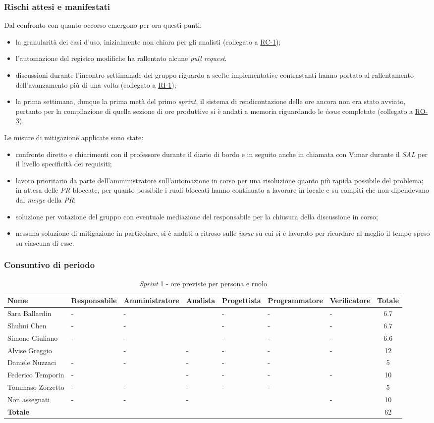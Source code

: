 \documentclass[11pt, a4paper]{article}
\newcommand{\rigaore}[8]{#1 & #2 & #3 & #4 & #5 & #6 & #7 & #8 \\ \hline}
\newcommand{\tabellaore}[3]{%
	\begin{table}[H]
		\centering
		\renewcommand{\arraystretch}{1.3}\small
		\setlength{\tabcolsep}{3pt}
		\setlength{\arrayrulewidth}{0.8pt}
		{\arrayrulecolor{gray!50}
			\begin{tabular}{|l|>{\centering\arraybackslash}p{1.65cm}|>{\centering\arraybackslash}p{1.65cm}|>{\centering\arraybackslash}p{1.65cm}|>{\centering\arraybackslash}p{1.65cm}|>{\centering\arraybackslash}p{1.65cm}|>{\centering\arraybackslash}p{1.65cm}|c|}
				\hline
				\rowcolor{gray!10}
				\textbf{Nome} &
				\hspace{0pt}\textbf{Responsabile} &
				\hspace{0pt}\textbf{Amministratore} &
				\hspace{0pt}\textbf{Analista} &
				\hspace{0pt}\textbf{Progettista} &
				\hspace{0pt}\textbf{Programmatore} &
				\hspace{0pt}\textbf{Verificatore} &
				\textbf{Totale} \\ \hline
				#3
		\end{tabular}}
		\caption{#1}\label{#2}
	\end{table}
}
\begin{document}
	\subsubsection{Rischi attesi e manifestati}
	Dal confronto con quanto occorso emergono per ora questi punti:
	\begin{itemize}
		\item la granularità dei casi d'uso, inizialmente non chiara per gli analisti (collegato a \hyperref[risk:RC-1]{RC-1});
		\item l'automazione del registro modifiche ha rallentato alcune \textit{pull request}.
		\item discussioni durante l'incontro settimanale del gruppo riguardo a scelte implementative contrastanti hanno portato al rallentamento dell'avanzamento più di una volta (collegato a \hyperref[risk:RI-1]{RI-1});
		\item la prima settimana, dunque la prima metà del primo \textit{sprint}, il sistema di rendicontazione delle ore ancora non era stato avviato, pertanto per la compilazione di quella sezione di ore produttive si è andati a memoria riguardando le \textit{issue} completate (collegato a \hyperref[risk:RO-3]{RO-3}).
	\end{itemize}
	Le misure di mitigazione applicate sono state:
	\begin{itemize}
		\item confronto diretto e chiarimenti con il professore durante il diario di bordo e in seguito anche in chiamata con Vimar durante il \textit{SAL} per il livello specificità dei requisiti;
		\item lavoro prioritario da parte dell'amministratore sull'automazione in corso per una risoluzione quanto più rapida possibile del problema; in attesa delle \textit{PR} bloccate, per quanto possibile i ruoli bloccati hanno continuato a lavorare in locale e su compiti che non dipendevano dal \textit{merge} della \textit{PR};
		\item soluzione per votazione del gruppo con eventuale mediazione del responsabile per la chiusura della discussione in corso;
		\item nessuna soluzione di mitigazione in particolare, si è andati a ritroso sulle \textit{issue} su cui si è lavorato per ricordare al meglio il tempo speso su ciascuna di esse.
	\end{itemize}
	
	\subsubsection{Consuntivo di periodo}
	\tabellaore{\textit{Sprint} 1 - ore previste per persona e ruolo}{tab:s1-prev}{
		\rigaore{Sara Ballardin}{-}{-}{6.7}{-}{-}{-}{6.7}
		\rigaore{Shuhui Chen}{-}{-}{6.7}{-}{-}{-}{6.7}
		\rigaore{Simone Giuliano}{-}{-}{6.6}{-}{-}{-}{6.6}
		\rigaore{Alvise Greggio}{12}{-}{-}{-}{-}{-}{12}
		\rigaore{Daniele Nuzzaci}{-}{-}{-}{-}{-}{5}{5}
		\rigaore{Federico Temporin}{-}{10}{-}{-}{-}{-}{10}
		\rigaore{Tommaso Zorzetto}{-}{-}{-}{-}{-}{5}{5}
		\rigaore{Non assegnati}{-}{-}{-}{6}{4}{-}{10}
		\rowcolor{gray!10} \rigaore{\textbf{Totale}}{12}{10}{20}{6}{4}{10}{62}
	}
	
\end{document}
